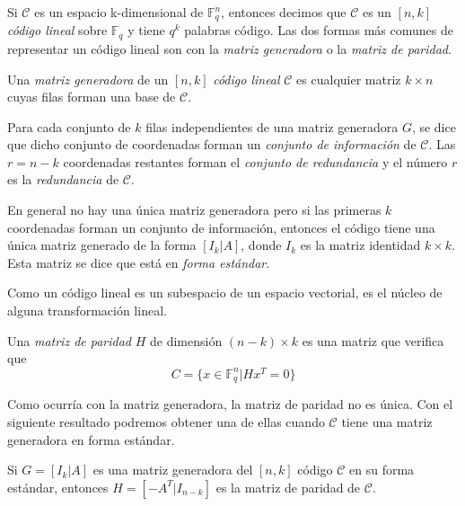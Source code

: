 Si $\mathcal{C}$ es un espacio k-dimensional de $\mathbb{F}_q^n$, entonces decimos que $\mathcal{C}$ es un $\left[n,k\right]$ \emph{código lineal} sobre $\mathbb{F}_q$ y tiene $q^k$ palabras código. Las dos formas más comunes de representar un código lineal son con la \emph{matriz generadora} o la \emph{matriz de paridad}.

\begin{definition}

Una \emph{matriz generadora} de un $\left[n,k\right]$ \emph{código lineal} $\mathcal{C}$ es cualquier matriz $k \times n$ cuyas filas forman una base de $\mathcal{C}$.
\end{definition}

Para cada conjunto de $k$ filas independientes de una matriz generadora $G$, se dice que dicho conjunto de coordenadas forman un \emph{conjunto de información} de $\mathcal{C}$. Las $r = n - k$ coordenadas restantes forman el \emph{conjunto de redundancia} y el número $r$ es la \emph{redundancia} de $\mathcal{C}$.

En general no hay una única matriz generadora pero si las primeras $k$ coordenadas forman un conjunto de información, entonces el código tiene una única matriz generado de la forma $\left[I_k | A\right]$, donde $I_k$ es la matriz identidad $k \times k$. Esta matriz se dice que está en \emph{forma estándar}.

Como un código lineal es un subespacio de un espacio vectorial, es el núcleo de alguna transformación lineal.

\begin{definition}
Una \emph{matriz de paridad} $H$ de dimensión $(n-k) \times k$ es una matriz que verifica que %
\[
C = \{ x \in  \mathbb{F}_q^n | Hx^T = 0  \}
\]
\end{definition}

Como ocurría con la matriz generadora, la matriz de paridad no es única. Con el siguiente resultado podremos obtener una de ellas cuando $\mathcal{C}$ tiene una matriz generadora en forma estándar.

\begin{theorem}
\label{th:matriz_paridad}

Si $G = \left[I_k | A\right]$ es una matriz generadora del $\left[n,k\right]$ código $\mathcal{C}$ en su forma estándar, entonces $H = \left[-A^T |I_{n-k}\right]$ es la matriz de paridad de $\mathcal{C}$.
\end{theorem}

